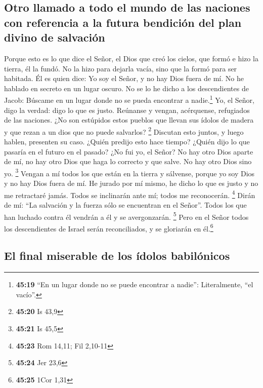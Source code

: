 \hypertarget{otro-llamado-a-todo-el-mundo-de-las-naciones-con-referencia-a-la-futura-bendiciuxf3n-del-plan-divino-de-salvaciuxf3n}{%
\subsection{Otro llamado a todo el mundo de las naciones con referencia
a la futura bendición del plan divino de
salvación}\label{otro-llamado-a-todo-el-mundo-de-las-naciones-con-referencia-a-la-futura-bendiciuxf3n-del-plan-divino-de-salvaciuxf3n}}

 Porque esto es lo que dice el Señor, el Dios que creó
los cielos, que formó e hizo la tierra, él la fundó. No la hizo para
dejarla vacía, sino que la formó para ser habitada. Él es quien dice: Yo
soy el Señor, y no hay Dios fuera de mí.  No he hablado
en secreto en un lugar oscuro. No se lo he dicho a los descendientes de
Jacob: Búscame en un lugar donde no se pueda encontrar a
nadie.\footnote{\textbf{45:19} ``En un lugar donde no se puede encontrar
  a nadie'': Literalmente, ``el vacío''.} Yo, el Señor, digo la verdad:
digo lo que es justo.  Reúnanse y vengan, acérquense,
refugiados de las naciones. ¿No son estúpidos estos pueblos que llevan
sus ídolos de madera y que rezan a un dios que no puede salvarlos?
\footnote{\textbf{45:20} Is 43,9}  Discutan esto juntos,
y luego hablen, presenten su caso. ¿Quién predijo esto hace tiempo?
¿Quién dijo lo que pasaría en el futuro en el pasado? ¿No fui yo, el
Señor? No hay otro Dios aparte de mí, no hay otro Dios que haga lo
correcto y que salve. No hay otro Dios sino yo. \footnote{\textbf{45:21}
  Is 45,5}  Vengan a mí todos los que están en la tierra
y sálvense, porque yo soy Dios y no hay Dios fuera de mí.
 He jurado por mí mismo, he dicho lo que es justo y no me
retractaré jamás. Todos se inclinarán ante mí; todos me reconocerán.
\footnote{\textbf{45:23} Rom 14,11; Fil 2,10-11}  Dirán
de mí: ``La salvación y la fuerza sólo se encuentran en el Señor''.
Todos los que han luchado contra él vendrán a él y se avergonzarán.
\footnote{\textbf{45:24} Jer 23,6}  Pero en el Señor
todos los descendientes de Israel serán reconciliados, y se gloriarán en
él.\footnote{\textbf{45:25} 1Cor 1,31}

\hypertarget{el-final-miserable-de-los-uxeddolos-babiluxf3nicos}{%
\subsection{El final miserable de los ídolos
babilónicos}\label{el-final-miserable-de-los-uxeddolos-babiluxf3nicos}}

